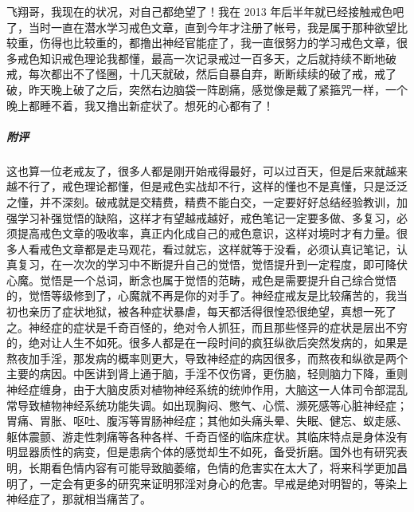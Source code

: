 \begin{case}
    飞翔哥，我现在的状况，对自己都绝望了！我在 2013 年后半年就已经接触戒色吧了，当时一直在潜水学习戒色文章，直到今年才注册了帐号，我是属于那种欲望比较重，伤得也比较重的，都撸出神经官能症了，我一直很努力的学习戒色文章，很多戒色知识戒色理论我都懂，最高一次记录戒过一百多天，之后就持续不断地破戒，每次都出不了怪圈，十几天就破，然后自暴自弃，断断续续的破了戒，戒了破，昨天晚上破了之后，突然右边脑袋一阵剧痛，感觉像是戴了紧箍咒一样，一个晚上都睡不着，我又撸出新症状了。想死的心都有了！
    \subparagraph{附评} 这也算一位老戒友了，很多人都是刚开始戒得最好，可以过百天，但是后来就越来越不行了，戒色理论都懂，但是戒色实战却不行，这样的懂也不是真懂，只是泛泛之懂，并不深刻。破戒就是交精费，精费不能白交，一定要好好总结经验教训，加强学习补强觉悟的缺陷，这样才有望越戒越好，戒色笔记一定要多做、多复习，必须提高戒色文章的吸收率，真正内化成自己的戒色意识，这样对境时才有力量。很多人看戒色文章都是走马观花，看过就忘，这样就等于没看，必须认真记笔记，认真复习，在一次次的学习中不断提升自己的觉悟，觉悟提升到一定程度，即可降伏心魔。觉悟是一个总词，断念也属于觉悟的范畴，戒色是需要提升自己综合觉悟的，觉悟等级修到了，心魔就不再是你的对手了。神经症戒友是比较痛苦的，我当初也亲历了症状地狱，被各种症状暴虐，每天都活得很惶恐很绝望，真想一死了之。神经症的症状是千奇百怪的，绝对令人抓狂，而且那些怪异的症状是层出不穷的，绝对让人生不如死。很多人都是在一段时间的疯狂纵欲后突然发病的，如果是熬夜加手淫，那发病的概率则更大，导致神经症的病因很多，而熬夜和纵欲是两个主要的病因。中医讲到肾上通于脑，手淫不仅伤肾，更伤脑，轻则脑力下降，重则神经症缠身，由于大脑皮质对植物神经系统的统帅作用，大脑这一人体司令部混乱常导致植物神经系统功能失调。如出现胸闷、憋气、心慌、濒死感等心脏神经症；胃痛、胃胀、呕吐、腹泻等胃肠神经症；其他如头痛头晕、失眠、健忘、蚁走感、躯体震颤、游走性刺痛等各种各样、千奇百怪的临床症状。其临床特点是身体没有明显器质性的病变，但是患病个体的感觉却生不如死，备受折磨。国外也有研究表明，长期看色情内容有可能导致脑萎缩，色情的危害实在太大了，将来科学更加昌明了，一定会有更多的研究来证明邪淫对身心的危害。早戒是绝对明智的，等染上神经症了，那就相当痛苦了。
\end{case}

